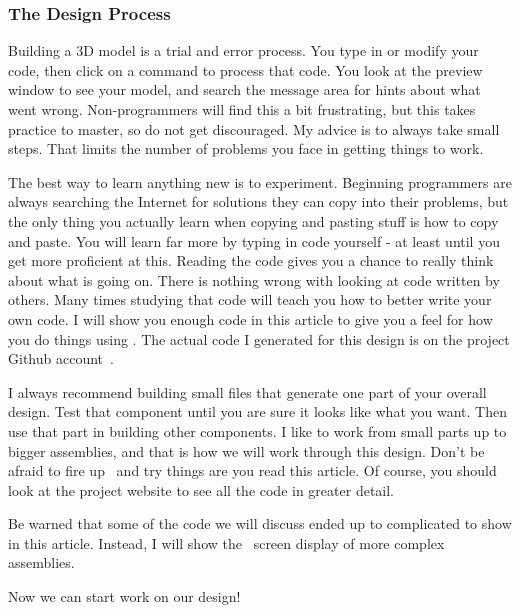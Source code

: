 \subsubsection{The Design Process}

Building a 3D model is a trial and error process. You type in or modify your
code, then click on a command to process that code. You look at the preview
window to see your model, and search the message area for hints about what went
wrong.  Non-programmers will find this a bit frustrating, but this takes
practice to master, so do not get discouraged. My advice is to always take
small steps.  That limits the number of problems you face in getting things to
work.

The best way to learn anything new is to experiment. Beginning programmers are
always searching the Internet for solutions they can copy into their problems,
but the only thing you actually learn when copying and pasting stuff is how to
copy and paste. You will learn far more by typing in code yourself - at least
until you get more proficient at this. Reading the code gives you a chance to
really think about what is going on. There is nothing wrong with looking at
code written by others. Many times studying that code will teach you how to
better write your own code. I will show you enough code in this article to give
you a feel for how you do things using \osc. The actual code I generated for
this design is on the project Github account~\cite{blackr}.

I always recommend building small files that generate one part of your overall
design. Test that component until you are sure it looks like what you want.
Then use that part in building other components. I like to work from small
parts up to bigger assemblies, and that is how we will work through this
design. Don't be afraid to fire up \osc\ and try things are you read this
article. Of course, you should look at the project website to see all the code
in greater detail.

Be warned that some of the code we will discuss ended up to complicated to show
in this article. Instead, I will show the \osc\ screen display of more complex assemblies.

Now we can start work on our design!

